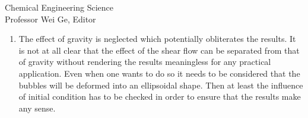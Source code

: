 \documentclass{letter}
\begin{document}
\begin{letter}{
Chemical Engineering Science\\
Professor Wei Ge, Editor\\}
\begin{enumerate}
\begin{tabbing}
 \hspace{55mm} \= \hspace{10mm} \kill
 \hspace{5mm} 1. $\lambda$ = 1.0, $\eta$ =1.0 (done) . $\lambda \simeq 0.0$, $\eta \simeq 0.0$ (this study) \\ 
 \hspace{5mm} 3. $\lambda$ = 1.0, $\eta \simeq 0.0$ (done) . $\lambda$ = 1.0, $\eta$ =0.01 \\
 \hspace{5mm} 5. $\lambda$ = 1.0, $\eta \simeq 0.1$ . $\lambda$ = 0.1, $\eta \simeq 0.0$ (done) \\
 \hspace{5mm} 7. $\lambda$ = 0.1, $\eta$ =0.01 . $\lambda = 0.1$, $\eta$ =0.1  \\
 \hspace{5mm} 9. $\lambda$ = 0.1, $\eta$ =1.0 (done) . $\lambda$ = 1.0, $\eta$ =10  \\
 \hspace{5mm} 11. $\lambda$ = 1.0, $\eta$ =100 . $\lambda$ = 1.0, $\eta$ =1000 \\
\end{tabbing}

Since it takes a very long computational time to obtain results for the effect of $\lambda$ and $\eta$ on drop deformation and breakup, 
all computations for these conditions have not been finished. We will also present the fruits of research on the effect of density and 
viscosity ratios in the next papers. \\
\\

\par\noindent
\item
\textsf
{The effect of gravity is neglected which potentially obliterates the results. It is not at all clear that the effect of the shear flow can be separated from that of gravity without rendering the results meaningless for any practical application. Even when one wants to do so it needs to be considered that the bubbles will be deformed into an ellipsoidal shape. Then at least the influence of initial condition has to be checked in order to ensure that the results make any sense. \\}
\vspace{3 mm}


\end{enumerate}
\end{letter}
\end{document}
